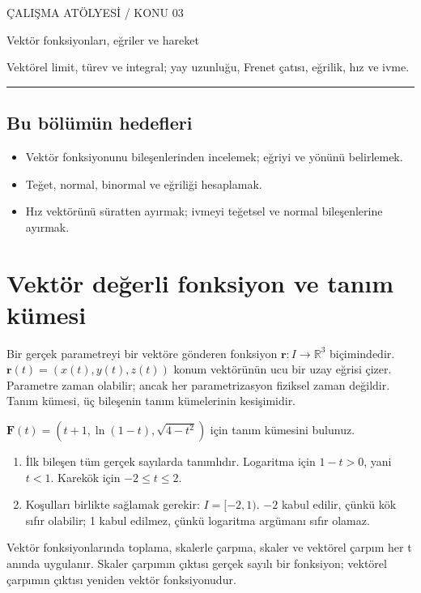 
{\sffamily\small\color{accent} ÇALIŞMA ATÖLYESİ / KONU 03\par}
\vspace{8mm}
{\Huge\sffamily\bfseries\raggedright{} Vektör fonksiyonları, eğriler ve hareket\par}
\vspace{3mm}
{\large Vektörel limit, türev ve integral; yay uzunluğu, Frenet çatısı, eğrilik, hız ve ivme.\par}
\vspace{4mm}\hrule\vspace{4mm}\subsection*{Bu bölümün hedefleri}\begin{itemize}
\item Vektör fonksiyonunu bileşenlerinden incelemek; eğriyi ve yönünü belirlemek.
\item Teğet, normal, binormal ve eğriliği hesaplamak.
\item Hız vektörünü süratten ayırmak; ivmeyi teğetsel ve normal bileşenlerine ayırmak.\end{itemize}
{\small\tableofcontents}\clearpage
\section{Vektör değerli fonksiyon ve tanım kümesi}
Bir gerçek parametreyi bir vektöre gönderen fonksiyon \(\mathbf r:I\to\mathbb R^3\) biçimindedir. \(\mathbf r(t)=(x(t),y(t),z(t))\) konum vektörünün ucu bir uzay eğrisi çizer. Parametre zaman olabilir; ancak her parametrizasyon fiziksel zaman değildir. Tanım kümesi, üç bileşenin tanım kümelerinin kesişimidir.

\begin{tcolorbox}[title={Örnek 3.1 | Defterdeki tanım kümesi örneği},colframe=accent]\(\mathbf F(t)=(t+1,\ln(1-t),\sqrt{4-t^2})\) için tanım kümesini bulunuz.
\par{}\end{tcolorbox}
\begin{tcolorbox}[title={Adım adım çözüm},colback=green!3!white,colframe=green]\begin{enumerate}
\item İlk bileşen tüm gerçek sayılarda tanımlıdır. Logaritma için \(1-t>0\), yani \(t<1\). Karekök için \(-2\le t\le2\).
\item Koşulları birlikte sağlamak gerekir: \(I=[-2,1)\). \(-2\) kabul edilir, çünkü kök sıfır olabilir; 1 kabul edilmez, çünkü logaritma argümanı sıfır olamaz.
\end{enumerate}\end{tcolorbox}
Vektör fonksiyonlarında toplama, skalerle çarpma, skaler ve vektörel çarpım her t anında uygulanır. Skaler çarpımın çıktısı gerçek sayılı bir fonksiyon; vektörel çarpımın çıktısı yeniden vektör fonksiyonudur.

